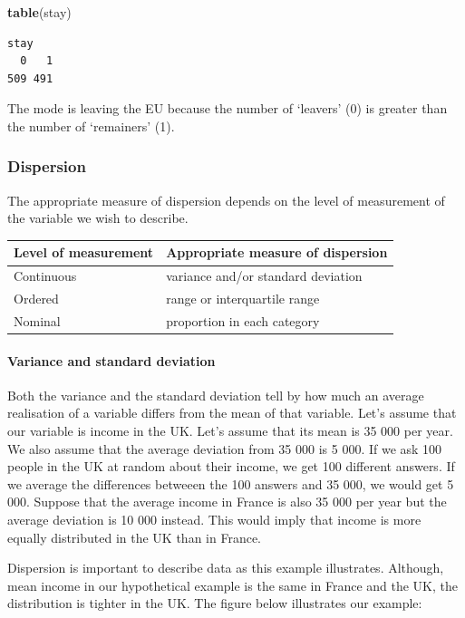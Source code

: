 \documentclass[]{article}
\newenvironment{Shaded}{\begin{snugshade}}{\end{snugshade}}
\newcommand{\KeywordTok}[1]{\textcolor[rgb]{0.13,0.29,0.53}{\textbf{#1}}}
\newcommand{\NormalTok}[1]{#1}
\let\oldparagraph\paragraph
\renewcommand{\paragraph}[1]{\oldparagraph{#1}\mbox{}}
\theoremstyle{definition}
\theoremstyle{definition}
\theoremstyle{definition}
\theoremstyle{remark}
\begin{document}
\begin{Shaded}
\begin{Highlighting}[]
\KeywordTok{table}\NormalTok{(stay)}
\end{Highlighting}
\end{Shaded}

\begin{verbatim}
stay
  0   1 
509 491 
\end{verbatim}

The mode is leaving the EU because the number of `leavers' (0) is
greater than the number of `remainers' (1).

\subsubsection{Dispersion}\label{dispersion}

The appropriate measure of dispersion depends on the level of
measurement of the variable we wish to describe.

\begin{longtable}[]{@{}ll@{}}
\toprule
Level of measurement & Appropriate measure of dispersion\tabularnewline
\midrule
\endhead
Continuous & variance and/or standard deviation\tabularnewline
Ordered & range or interquartile range\tabularnewline
Nominal & proportion in each category\tabularnewline
\bottomrule
\end{longtable}

\paragraph{Variance and standard
deviation}\label{variance-and-standard-deviation}

Both the variance and the standard deviation tell by how much an average
realisation of a variable differs from the mean of that variable. Let's
assume that our variable is income in the UK. Let's assume that its mean
is 35 000 per year. We also assume that the average deviation from 35
000 is 5 000. If we ask 100 people in the UK at random about their
income, we get 100 different answers. If we average the differences
betweeen the 100 answers and 35 000, we would get 5 000. Suppose that
the average income in France is also 35 000 per year but the average
deviation is 10 000 instead. This would imply that income is more
equally distributed in the UK than in France.

Dispersion is important to describe data as this example illustrates.
Although, mean income in our hypothetical example is the same in France
and the UK, the distribution is tighter in the UK. The figure below
illustrates our example:
\end{document}
